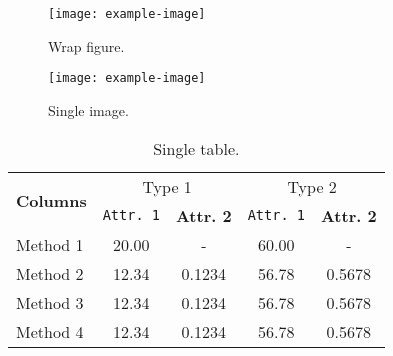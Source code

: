 \documentclass{article}
\begin{document}
\begin{wrapfigure}[14]{R}{0.4\textwidth}
    \vspace{-10pt}
    \centering
    \texttt{[image: example-image]}
    \vspace{-15pt}
    \caption{Wrap figure.}
    \label{fig:wrap-figure}
\end{wrapfigure}
\lipsum[1]
\begin{wraptable}[10]{L}{0.4\textwidth}
    \vspace{-12pt}
    \centering
    \caption{Wrap table.}
    \label{tab:warp-table}
    \vspace{-8pt}
\end{wraptable}
\lipsum[2-3]




\begin{figure}[ht]
    \centering
    \texttt{[image: example-image]}
    \caption{Single image.}
    \label{fig:single}
\end{figure}

\begin{table}[ht]
    \centering
    \begin{tabular}{l|cc|cc}
    \toprule
    \multirow{2}{*}{\textbf{Columns}} & \multicolumn{2}{c|}{Type 1} & \multicolumn{2}{c}{Type 2} \\
    & \texttt{Attr. 1}  & \textbf{Attr. 2}   & \texttt{Attr. 1}  & \textbf{Attr. 2}  \\
    \midrule
    Method 1    & 20.00  & - & 60.00 & -     \\
    Method 2    & 12.34  & 0.1234 & 56.78 & 0.5678     \\
    Method 3    & 12.34  & 0.1234 & 56.78 & 0.5678     \\
    Method 4    & 12.34  & 0.1234 & 56.78 & 0.5678     \\
    \bottomrule
    \end{tabular}%
    \caption{Single table.}
    \label{tab:single}
\end{table}
\end{document}
